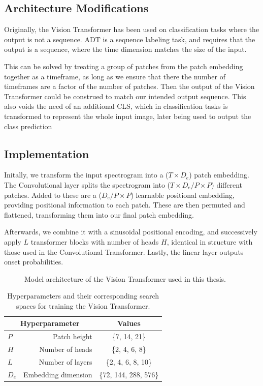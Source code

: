 \subsection{Architecture Modifications}

Originally, the Vision Transformer has been used on classification tasks where the output is not a sequence. \gls{ADT} is a sequence labeling task, and requires that the output is a sequence, where the time dimension matches the size of the input.

This can be solved by treating a group of patches from the patch embedding together as a timeframe, as long as we ensure that there the number of timeframes are a factor of the number of patches. Then the output of the Vision Transformer could be construed to match our intended output sequence. This also voids the need of an additional \gls{CLS}, which in classification tasks is transformed to represent the whole input image, later being used to output the class prediction~\cite{dosovitskiy2021imageworth16x16words}

\subsection{Implementation}

Initally, we transform the input spectrogram into a ($T \times D_e$) patch embedding. The Convolutional layer splits the spectrogram into ($T \times D_e / P \times P$) different patches. Added to these are a ($D_e / P \times P$) learnable positional embedding, providing positional information to each patch. These are then permuted and flattened, transforming them into our final patch embedding.

Afterwards, we combine it with a sinusoidal positional encoding, and successively apply $L$ transformer blocks with number of heads $H$, identical in structure with those used in the Convolutional Transformer. Lastly, the linear layer outputs onset probabilities.

\begin{figure}[H]
    \hspace*{-0.5cm}
    \centering
    
    \caption{Model architecture of the Vision Transformer used in this thesis.}
    \label{ViTFigure}
\end{figure}

\begin{table}[H]
    \centering
    \begin{tabular}{lr|c}
        \multicolumn{2}{c|}{Hyperparameter} & Values       \\
        \hline
        $P$ & Patch height      & \{7, 14, 21\} \\
        $H$ & Number of heads     & \{2, 4, 6, 8\} \\
        $L$ & Number of layers      & \{2, 4, 6, 8, 10\} \\
        $D_e$ & Embedding dimension      & \{72, 144, 288, 576\} \\
    \end{tabular}
    \caption{Hyperparameters and their corresponding search spaces for training the Vision Transformer.}
    \label{ViTHyperparams}
\end{table}